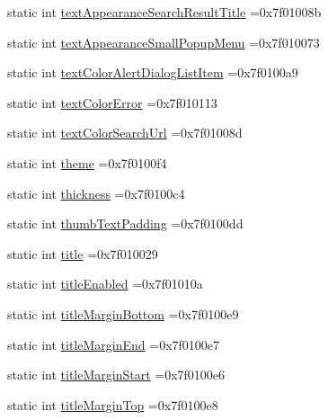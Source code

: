 \begin{DoxyCompactItemize}
static int \hyperlink{classandroid_1_1support_1_1v7_1_1cardview_1_1R_1_1attr_a7ef9f14e832603a80a69a476d01e22f3}{text\+Appearance\+Search\+Result\+Title} =0x7f01008b
\item 
static int \hyperlink{classandroid_1_1support_1_1v7_1_1cardview_1_1R_1_1attr_a33d0659633dc1776cf97b3cce1cc6e27}{text\+Appearance\+Small\+Popup\+Menu} =0x7f010073
\item 
static int \hyperlink{classandroid_1_1support_1_1v7_1_1cardview_1_1R_1_1attr_a173e914627b371b0d2f5da8b4c71b625}{text\+Color\+Alert\+Dialog\+List\+Item} =0x7f0100a9
\item 
static int \hyperlink{classandroid_1_1support_1_1v7_1_1cardview_1_1R_1_1attr_a6ebe55f0aafed61cb45ed177453eb969}{text\+Color\+Error} =0x7f010113
\item 
static int \hyperlink{classandroid_1_1support_1_1v7_1_1cardview_1_1R_1_1attr_a86da2cd11159845c8daaa8dbdda4e306}{text\+Color\+Search\+Url} =0x7f01008d
\item 
static int \hyperlink{classandroid_1_1support_1_1v7_1_1cardview_1_1R_1_1attr_aae85a62e5df536faad431dd28ed3e990}{theme} =0x7f0100f4
\item 
static int \hyperlink{classandroid_1_1support_1_1v7_1_1cardview_1_1R_1_1attr_a6886117481f6f9c9efb4113aa9fc48fe}{thickness} =0x7f0100c4
\item 
static int \hyperlink{classandroid_1_1support_1_1v7_1_1cardview_1_1R_1_1attr_abf506594cf166db51e2592071996565b}{thumb\+Text\+Padding} =0x7f0100dd
\item 
static int \hyperlink{classandroid_1_1support_1_1v7_1_1cardview_1_1R_1_1attr_a152f347649775e5aee3805c09dbbab39}{title} =0x7f010029
\item 
static int \hyperlink{classandroid_1_1support_1_1v7_1_1cardview_1_1R_1_1attr_a2d1b48caa3eb8f5dc01cf4ef925c372d}{title\+Enabled} =0x7f01010a
\item 
static int \hyperlink{classandroid_1_1support_1_1v7_1_1cardview_1_1R_1_1attr_ace29ea625b906bbd584e71a4b1d16516}{title\+Margin\+Bottom} =0x7f0100e9
\item 
static int \hyperlink{classandroid_1_1support_1_1v7_1_1cardview_1_1R_1_1attr_ad40d5056e5b59a08e333810b3d2c4ee0}{title\+Margin\+End} =0x7f0100e7
\item 
static int \hyperlink{classandroid_1_1support_1_1v7_1_1cardview_1_1R_1_1attr_a050e6de5fb5747b3da0d7378d952214c}{title\+Margin\+Start} =0x7f0100e6
\item 
static int \hyperlink{classandroid_1_1support_1_1v7_1_1cardview_1_1R_1_1attr_a50fe0b534598095ab1c78c567cd09649}{title\+Margin\+Top} =0x7f0100e8

\end{DoxyCompactItemize}
